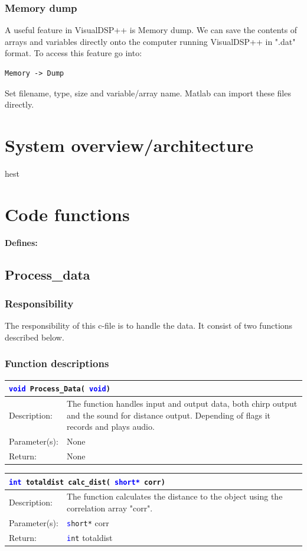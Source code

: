 \subsubsection{Memory dump}
A useful feature in VisualDSP++ is Memory dump. We can save the contents of arrays and variables directly onto the computer running VisualDSP++ in ".dat" format. To access this feature go into:
\begin{verbatim}
Memory -> Dump
\end{verbatim}
Set filename, type, size and variable/array name. Matlab can import these files directly.



\section{System overview/architecture}
hest

\section{Code functions}
\textbf{Defines:}\\

\subsection{Process\_data}
\subsubsection{Responsibility}
The responsibility of this c-file is to handle the data. It consist of two functions described below.
\subsubsection{Function descriptions}
\begin{table}[H]
\begin{tabular}{l p{12.5cm}}
\multicolumn{2}{l}{\texttt{\textcolor{blue}{void} Process\_Data( \textcolor{blue}{void})}} \\
\hline
Description:& The function handles input and output data, both chirp output and the sound for distance output. Depending of flags it records and plays audio.\\
Parameter(s):&None\\
Return:&None\\
\end{tabular}
\end{table}
\begin{table}[H]
\begin{tabular}{l p{12.5cm}}
\multicolumn{2}{l}{\texttt{\textcolor{blue}{int} totaldist calc\_dist( \textcolor{blue}{short*} corr)}} \\
\hline
Description:& The function calculates the distance to the object using the correlation array "corr".\\
Parameter(s):&\texttt{\textcolor{blue}short*} corr\\
Return:&\texttt{\textcolor{blue}int} totaldist\\
\end{tabular}
\end{table}


